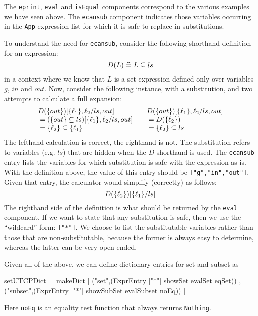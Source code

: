 The \texttt{eprint}, \texttt{eval} and \texttt{isEqual} components correspond
to the various examples we have seen above.
The \texttt{ecansub} component
indicates those variables occurring in the \texttt{App} expression
list for which it is safe to replace in substitutions.

To understand the need for \texttt{ecansub},
consider the following shorthand definition for an expression:
\[
  D(L) \mathrel{\widehat=} L \subseteq ls
\]
in a context where we know that $L$ is a set expression defined
only over variables $g$, $in$ and $out$.
Now, consider the following instance, with a substitution,
and two attempts to calculate a full expansion:
\[\begin{array}{l@{\qquad}l}
   D(\setof{out})[\setof{\ell_1},\ell_2/ls,out]
 & D(\setof{out})[\setof{\ell_1},\ell_2/ls,out]
\\ {} = (\setof{out} \subseteq ls)[\setof{\ell_1},\ell_2/ls,out]
 & {}= D(\setof{\ell_2})
\\ {} = \setof{\ell_2} \subseteq \setof{\ell_1}
 & {} = \setof{\ell_2} \subseteq ls
\end{array}\]
The lefthand calculation is correct, the righthand is not.
The substitution refers to variables (e.g. $ls$)
that are hidden when the $D$ shorthand is used.
The \texttt{ecansub} entry lists the variables for which substitution
is safe with the expression as-is.
With the definition above, the value of this entry
 should be \texttt{["g","in","out"]}.
Given that entry, the calculator would simplify (correctly) as follows:
\[
  D(\{{\ell_2}\})[\{{\ell_1}\}/ls]
\]
The righthand side of the definition is what should be returned
by the \texttt{eval} component.
If we want to state that any substitution is safe,
then we use the ``wildcard'' form: \texttt{["*"]}.
We choose to list the substitutable variables
rather than those that are non-substitutable,
because the former is always easy to determine,
whereas the latter can be very open ended.

Given all of the above,
we can define dictionary entries for set and subset as
\begin{code}
setUTCPDict
 = makeDict
    [ ("set",(ExprEntry ["*"] showSet evalSet eqSet))
    , ("subset",(ExprEntry ["*"] showSubSet evalSubset noEq)) ]
\end{code}
Here \texttt{noEq} is an equality test function that always returns \texttt{Nothing}.
